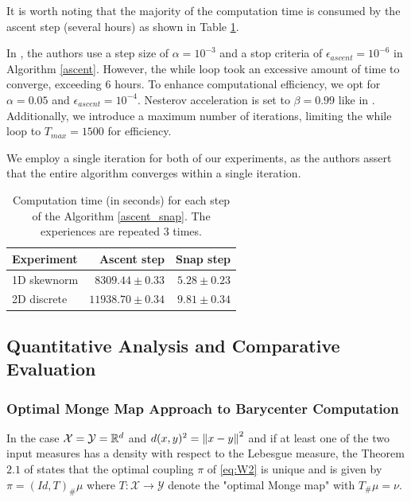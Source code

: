It is worth noting that the majority of the computation time is consumed by the ascent step (several hours) as shown in Table \ref{table:time_algo_table}.

In \cite{claici_stochastic_2018}, the authors use a step size of $\alpha = 10^{-3}$ and a stop criteria of $\epsilon_{ascent} = 10^{-6}$ in Algorithm \ref{ascent}. However, the while loop took an excessive amount of time to converge, exceeding $6$ hours. To enhance computational efficiency, we opt for $\alpha = 0.05$ and $\epsilon_{ascent} = 10^{-4}$. Nesterov acceleration is set to $\beta = 0.99$ like in \cite{claici_stochastic_2018}. Additionally, we introduce a maximum number of iterations, limiting the while loop to $T_{max} = 1500$ for efficiency. 

We employ a single iteration for both of our experiments, as the authors \cite{claici_stochastic_2018} assert that the entire algorithm converges within a single iteration.

\begin{table}
    \begin{center}
            \begin{tabular}{lrr}
                    Experiment & Ascent step & Snap step \\
                    \hline\hline
                    1D skewnorm & $8309.44 \pm 0.33$ & $5.28 \pm 0.23$ \\
                    2D discrete & $11938.70 \pm 0.34$ & $9.81 \pm 0.34$ \\
            \end{tabular}
    \end{center}
    \caption{Computation time (in seconds) for each step of the Algorithm \ref{ascent_snap}. The experiences are repeated $3$ times.}
    \label{table:time_algo_table}
\end{table}

\subsection{Quantitative Analysis and Comparative Evaluation}

\subsubsection{Optimal Monge Map Approach to Barycenter Computation}
\label{sec:monge_map}

In the case $\mathcal{X} = \mathcal{Y} = \mathbb{R}^d$ and $d(x, y)^2 = \left\lVert x  - y\right\rVert^2$ and if at least one of the two input measures has a density with respect to the Lebesgue measure, the Theorem $2.1$ of \cite{peyre_computational_2020} states that the optimal coupling $\pi$ of \eqref{eq:W2} is unique and is given by $\pi = (Id, T)_\#\mu$ where $T : \mathcal{X} \rightarrow \mathcal{Y}$ denote the "optimal Monge map" with $T_\#\mu = \nu$. 

